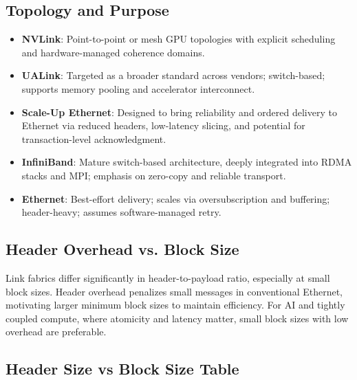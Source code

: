 \subsection{Topology and Purpose}


\begin{itemize}
  \item \textbf{NVLink}: Point-to-point or mesh GPU topologies with explicit scheduling and hardware-managed coherence domains.
  \item \textbf{UALink}: Targeted as a broader standard across vendors; switch-based; supports memory pooling and accelerator interconnect.
  \item \textbf{Scale-Up Ethernet}: Designed to bring reliability and ordered delivery to Ethernet via reduced headers, low-latency slicing, and potential for transaction-level acknowledgment.
  \item \textbf{InfiniBand}: Mature switch-based architecture, deeply integrated into RDMA stacks and MPI; emphasis on zero-copy and reliable transport.
  \item \textbf{Ethernet}: Best-effort delivery; scales via oversubscription and buffering; header-heavy; assumes software-managed retry.
\end{itemize}

\subsection{Header Overhead vs. Block Size}

Link fabrics differ significantly in header-to-payload ratio, especially at small block sizes. Header overhead penalizes small messages in conventional Ethernet, motivating larger minimum block sizes to maintain efficiency. For AI and tightly coupled compute, where atomicity and latency matter, small block sizes with low overhead are preferable.

\subsection{Header Size vs Block Size Table}

